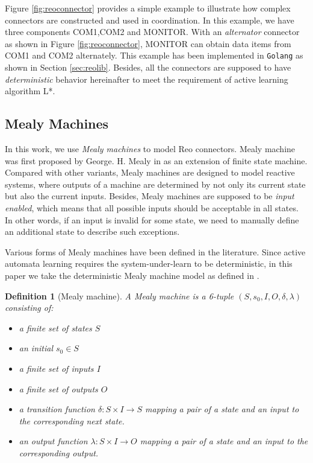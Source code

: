 \documentclass[conference, a4paper]{IEEEtran}
\newtheorem{definition}{Definition}
\begin{document}
Figure \ref{fig:reoconnector} provides a simple example to illustrate how complex
connectors are constructed and used in coordination. In this example, we have three components
COM1,COM2 and MONITOR. With an \emph{alternator} connector as shown in Figure
\ref{fig:reoconnector}, MONITOR can obtain data items from COM1 and COM2 alternately. This example
has been implemented in \texttt{Golang} as shown in Section \ref{sec:reolib}.
Besides, all the connectors are supposed to have \emph{deterministic} behavior hereinafter to meet
the requirement of active learning algorithm L*.


\subsection{Mealy Machines}

In this work, we use \emph{Mealy machines} to model Reo connectors.
Mealy machine was first proposed by George. H. Mealy in \cite{George1955A} as an extension of finite
state machine. Compared with other variants, Mealy machines are designed to model
reactive systems, where outputs of a machine are determined by not only its current state but also
the current inputs. Besides, Mealy machines are supposed to be \emph{input enabled}, which means
that all possible inputs should be acceptable in all states. In other words, if an input is invalid
for some state, we need to manually define an additional state to describe such exceptions.

Various forms of Mealy machines have been defined in the literature. 
Since active automata learning requires the system-under-learn to be deterministic, in
this paper we take the deterministic Mealy machine model as defined in 
\cite{DBLP:conf/sfm/SteffenHM11}. 

\begin{definition}[Mealy machine]
  A Mealy machine is a 6-tuple $(S, s_0, I, O, \delta, \lambda)$ consisting of:
  \begin{itemize}
    \item[-] a finite set of states $S$
    \item[-] an initial $s_0\in S$
    \item[-] a finite set of inputs $I$
    \item[-] a finite set of outputs $O$
    \item[-] a transition function $\delta : S \times I \rightarrow S$ mapping a pair of a
      state and an input to the corresponding next state.
    \item[-] an output function $\lambda : S \times  I \rightarrow O$ mapping a pair
      of a state and an input to the corresponding output.
  \end{itemize}
\end{definition}
\end{document}
